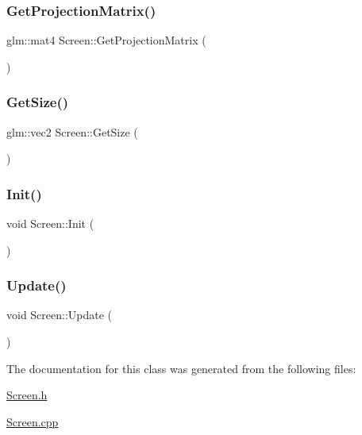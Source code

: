 \mbox{\label{class_screen_ad43c28bb9ccca3ef351dfd4d9f347fb0}} 
\subsubsection{\texorpdfstring{Get\+Projection\+Matrix()}{GetProjectionMatrix()}}
{\footnotesize\ttfamily glm\+::mat4 Screen\+::\+Get\+Projection\+Matrix (\begin{DoxyParamCaption}{ }\end{DoxyParamCaption})\hspace{0.3cm}{\ttfamily [inline]}}

\mbox{\label{class_screen_a2b2783809f44b124f19b45fbd0c21241}} 
\subsubsection{\texorpdfstring{Get\+Size()}{GetSize()}}
{\footnotesize\ttfamily glm\+::vec2 Screen\+::\+Get\+Size (\begin{DoxyParamCaption}{ }\end{DoxyParamCaption})\hspace{0.3cm}{\ttfamily [inline]}}

\mbox{\label{class_screen_a2da4b3a4b37151b4f0ac1e9d3c189d10}} 
\subsubsection{\texorpdfstring{Init()}{Init()}}
{\footnotesize\ttfamily void Screen\+::\+Init (\begin{DoxyParamCaption}{ }\end{DoxyParamCaption})}

\mbox{\label{class_screen_a022bd9b551faa54312ef867267865ec7}} 
\subsubsection{\texorpdfstring{Update()}{Update()}}
{\footnotesize\ttfamily void Screen\+::\+Update (\begin{DoxyParamCaption}{ }\end{DoxyParamCaption})}



The documentation for this class was generated from the following files\+:\begin{DoxyCompactItemize}
\item 
\mbox{\hyperlink{_screen_8h}{Screen.\+h}}\item 
\mbox{\hyperlink{_screen_8cpp}{Screen.\+cpp}}\end{DoxyCompactItemize}
